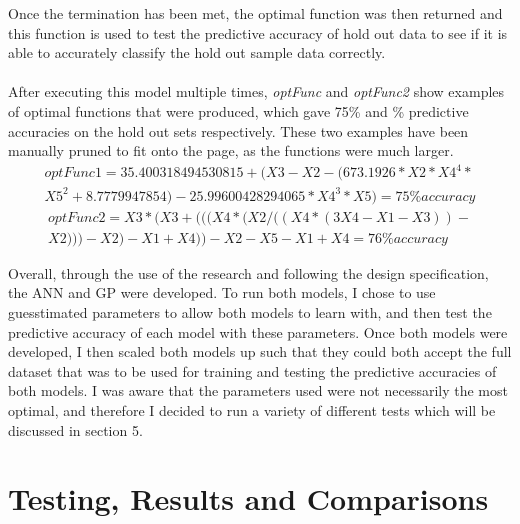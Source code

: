 \documentclass[11pt]{article}
\begin{document}
Once the termination has been met, the optimal function was then returned and this function is used to test the predictive accuracy of hold out data to see if it is able to accurately classify the hold out sample data correctly. \\\\
After executing this model multiple times, \textit{optFunc} and \textit{optFunc2} show examples of optimal functions that were produced, which gave 75\% and \% predictive accuracies on the hold out sets respectively.  These two examples have been manually pruned to fit onto the page, as the functions were much larger. 
\begin{align*}
optFunc1=  35.400318494530815+(X3-X2-(673.1926*X2*X4^4*\\
X5^2+8.7779947854)-25.99600428294065*X4^3*X5) = 75\%  accuracy
\end{align*}
\begin{align*}
optFunc2 = X3*(X3+(((X4*(X2/((X4*(3X4-X1-X3))-\\
X2)))-X2)-X1+X4))-X2-X5-X1+X4 = 76\%  accuracy
\end{align*}

Overall, through the use of the research and following the design specification, the ANN and GP were developed. To run both models, I chose to use guesstimated parameters to allow both models to learn with, and then test the predictive accuracy of each model with these parameters. Once both models were developed, I then scaled both models up such that they could both accept the full dataset that was to be used for training and testing the predictive accuracies of both models. I was aware that the parameters used were not necessarily the most optimal, and therefore I decided to run a variety of different tests which will be discussed in section 5. 
\section{Testing, Results and Comparisons} \label{sec:TRC}%
\end{document}
